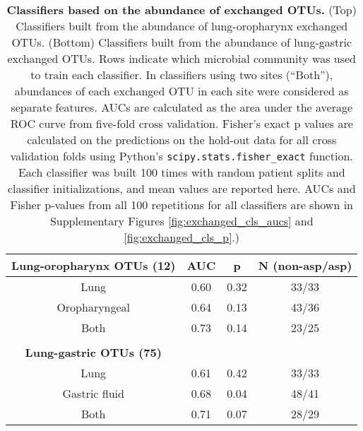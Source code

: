 \documentclass{article}
\begin{document}
\FloatBarrier
\newpage \pdfpagewidth=8.5in \pdfpageheight=11in


\begin{table}
\begin{center}

\begin{tabular}{cccc}  
\textbf{Lung-oropharynx OTUs (12)} & AUC & p & N (non-asp/asp) \\
\midrule
Lung & 0.60 & 0.32 & 33/33 \\
Oropharyngeal & 0.64 & 0.13 & 43/36 \\
Both & 0.73 & 0.14 & 23/25 \\
\bottomrule
\\
\textbf{Lung-gastric OTUs (75)} &  & & \\
\midrule
Lung & 0.61 & 0.42 & 33/33 \\
Gastric fluid & 0.68 & 0.04 & 48/41 \\
Both & 0.71 & 0.07 & 28/29 \\
\bottomrule
\end{tabular}
\caption{\textbf{Classifiers based on the abundance of exchanged OTUs.} (Top) Classifiers built from the abundance of lung-oropharynx exchanged OTUs. (Bottom) Classifiers built from the abundance of lung-gastric exchanged OTUs. Rows indicate which microbial community was used to train each classifier. In classifiers using two sites (``Both''), abundances of each exchanged OTU in each site were considered as separate features. AUCs are calculated as the area under the average ROC curve from five-fold cross validation. Fisher's exact p values are calculated on the predictions on the hold-out data for all cross validation folds using Python's \texttt{scipy.stats.fisher\_exact} function. Each classifier was built 100 times with random patient splits and classifier initializations, and mean values are reported here. AUCs and Fisher p-values from all 100 repetitions for all classifiers are shown in Supplementary Figures \ref{fig:exchanged_cls_aucs} and \ref{fig:exchanged_cls_p}.)}\label{tab:abun-exchange-classifiers}
\end{center}
\end{table}

\newpage
\FloatBarrier
\end{document}
